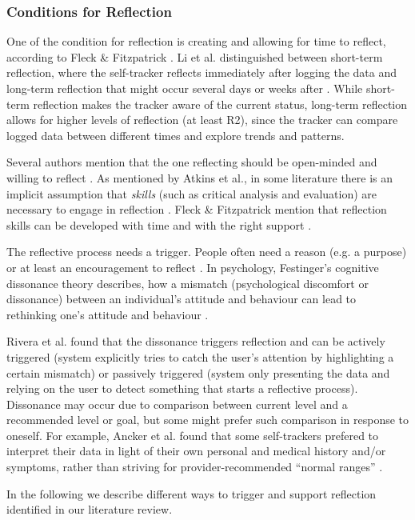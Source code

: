 \subsubsection{Conditions for Reflection}
One of the condition for reflection is creating and allowing for time to reflect, according to Fleck \& Fitzpatrick \cite{Fleck}. Li et al. distinguished between short-term reflection, where the self-tracker reflects immediately after logging the data and long-term reflection that might occur several days or weeks after \cite{Li2010}. While short-term reflection makes the tracker aware of the current status, long-term reflection allows for higher levels of reflection (at least R2), since the tracker can compare logged data between different times and explore trends and patterns. 

Several authors mention that the one reflecting should be open-minded and willing to reflect \cite{Atkins, Rogers}. As mentioned by Atkins et al., in some literature there is an implicit assumption that \textit{skills} (such as critical analysis and evaluation) are necessary to engage in reflection \cite{Atkins, Rogers}. Fleck \& Fitzpatrick mention that reflection skills can be developed with time and with the right support \cite{Fleck}.

The reflective process needs a trigger. People often need a reason (e.g. a purpose) or at least an encouragement to reflect \cite{Fleck, Mols}. In psychology, Festinger’s cognitive dissonance theory describes, how a mismatch (psychological discomfort or dissonance) between an individual's attitude and behaviour can lead to rethinking one’s attitude and behaviour \cite{Rivera}. 

Rivera et al. found that the dissonance triggers reflection and can be actively triggered (system explicitly tries to catch the user’s attention by highlighting a certain mismatch) or passively triggered (system only presenting the data and relying on the user to detect something that starts a reflective process). Dissonance may occur due to comparison between current level and a recommended level or goal, but some might prefer such comparison in response to oneself. For example, Ancker et al. found that some self-trackers prefered to interpret their data in light of their own personal and medical history and/or symptoms, rather than striving for provider-recommended “normal ranges” \cite{Ancker2015}. 

In the following we describe different ways to trigger and support reflection identified in our literature review. 

